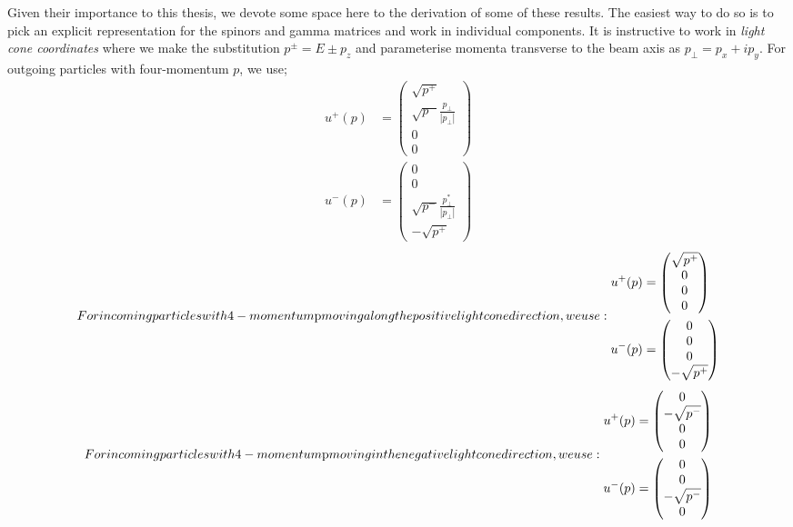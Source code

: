 Given their importance to this thesis, we devote some space here to the derivation of some of these results. The easiest way to do so is to pick an explicit representation for the spinors and gamma matrices and work in individual components. It is instructive to work in \emph{light cone coordinates} where we make the substitution $p^{\pm} = E \pm p_z$ and parameterise momenta transverse to the beam axis as $p_\perp = p_x + ip_y$. For outgoing particles with four-momentum $p$, we use;
\begin{subequations}
\begin{align}
u^+(p) &= 
 \begin{pmatrix}
  \sqrt{p^+} \\
  \sqrt{p^-}\frac{p_{\perp}}{|p_{\perp}|}\\
  0 \\
  0
 \end{pmatrix}\\
 u^-(p) &= 
 \begin{pmatrix}
  0 \\
  0 \\
  \sqrt{p^-}\frac{p_{\perp}^*}{|p_{\perp}|} \\
  -\sqrt{p^+}
 \end{pmatrix}
\end{align}
\end{subequations}
\begin{subequations}
For incoming particles with 4-momentum $p$ moving along the positive light cone direction, we use: 
\begin{align}
u^+(p) &= 
 \begin{pmatrix}
  \sqrt{p^+} \\
  0\\
  0 \\
  0
 \end{pmatrix}\\
 u^-(p) &= 
 \begin{pmatrix}
  0 \\
  0 \\
  0 \\
  -\sqrt{p^+}
 \end{pmatrix}
\end{align}
\end{subequations}
\begin{subequations}
For incoming particles with 4-momentum $p$ moving in the negative light cone direction, we use:
\begin{align}
u^+(p) &= 
 \begin{pmatrix}
  0 \\
  -\sqrt{p^-}\\
  0 \\
  0
 \end{pmatrix}\\
 u^-(p) &= 
 \begin{pmatrix}
  0 \\
  0 \\
  -\sqrt{p^-} \\
  0
 \end{pmatrix}
\end{align}
\end{subequations}

